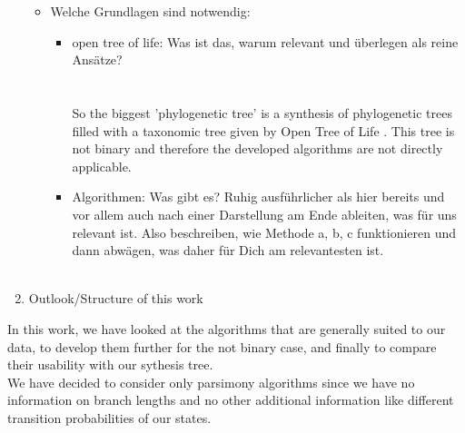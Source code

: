 \begin{enumerate}
\begin{itemize}
        \item Welche Grundlagen sind notwendig:
          \begin{itemize}
            \item open tree of life: Was ist das, warum relevant und überlegen als reine Ansätze? \\
              \todo{!!!} \\ \\
  So the biggest 'phylogenetic tree' is a synthesis 
    of phylogenetic trees filled with a taxonomic tree given by Open Tree of Life \cite{Hinchliff2015}.
    This tree is not binary and therefore the developed algorithms are not directly applicable. \\
            \item Algorithmen: Was gibt es? Ruhig ausführlicher als hier bereits und vor allem auch 
              nach einer Darstellung am Ende ableiten, was für uns relevant ist. Also beschreiben, 
              wie Methode a, b, c funktionieren und dann abwägen, was daher für Dich am 
              relevantesten ist. \\
              \todo{!!!} \\
          \end{itemize}
      \end{itemize}
    \item Outlook/Structure of this work
  \end{enumerate}


  In this work, we have looked at the algorithms that are generally suited to our data, to develop 
  them further for the not binary case, and finally to compare their usability with our sythesis 
  tree. \\
  We have decided to consider only parsimony algorithms since we have no information on branch 
  lengths and no other additional information like different transition probabilities of our states.

